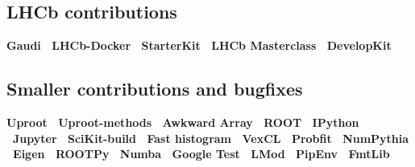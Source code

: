 \documentclass[10pt,letterpaper,english]{moderncv}
\begin{document}
\subsection{LHCb contributions}
\textbf{%
	Gaudi \bullet\ 
	LHCb-Docker \bullet\ 
	StarterKit \bullet\ 
	LHCb Masterclass \bullet\ 
	DevelopKit
}

\subsection{Smaller contributions and bugfixes}
\textbf{%
	Uproot  \bullet\ 
	Uproot-methods \bullet\ 
	Awkward Array \bullet\ 
	ROOT \bullet\ 
	IPython \bullet\ 
	Jupyter \bullet\ 
	SciKit-build \bullet\ 
	Fast histogram \bullet\  
	VexCL \bullet\ 
	Probfit  \bullet\ 
	NumPythia \bullet\ 
	Eigen  \bullet\ 
    ROOTPy \bullet\ 
    Numba \bullet\  
    Google Test  \bullet\ 
    LMod \bullet\
    PipEnv \bullet\ 
    FmtLib
}


\end{document}
